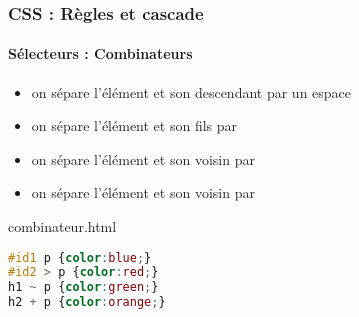 \documentclass[xcolor=table]{beamer}
\begin{document}
\begin{frame}[fragile]
\frametitle{CSS : Règles et cascade}
\framesubtitle{Sélecteurs : Combinateurs}

\begin{minipage}{0.60\textwidth} 
	\begin{itemize}
		\item {} on sépare l'élément et son descendant par un espace
		\item {} on sépare l'élément et son fils par \keyword{>}
		\item {} on sépare l'élément et son voisin par \keyword{\textasciitilde}
		\item {} on sépare l'élément et son voisin par \keyword{+}
	\end{itemize}
\end{minipage}
%
\begin{minipage}{0.38\textwidth}
\begin{exampleblock}{combinateur.html}
\lstset{escapeinside=**}
\scriptsize\bfseries
\begin{lstlisting}[language={CSS}]
#id1 p {color:blue;}
#id2 > p {color:red;}
h1 ~ p {color:green;}
h2 + p {color:orange;}
\end{lstlisting}
\end{exampleblock}
\end{minipage}
\end{frame}
\end{document}
